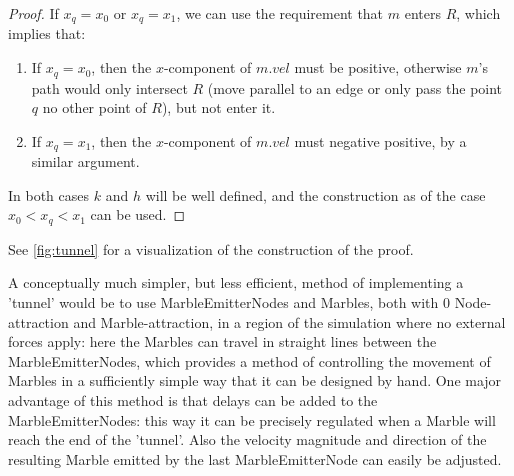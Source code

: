 \begin{proof}
    If $x_q = x_0$ or $x_q = x_1$, we can use the requirement that $m$ enters $R$, which implies that:
    \begin{enumerate}
        \item If $x_q = x_0$, then the $x$-component of $m.vel$ must be positive, otherwise $m$'s path would only intersect $R$ (move parallel to an edge or only pass the point $q$ no other point of $R$), but not enter it.
        \item If $x_q = x_1$, then the $x$-component of $m.vel$ must negative positive, by a similar argument.
    \end{enumerate}
    In both cases $k$ and $h$ will be well defined, and the construction as of the case $x_0 < x_q < x_1$ can be used.
\end{proof}

See \ref{fig:tunnel} for a visualization of the construction of the proof. 

A conceptually much simpler, but less efficient, method of implementing a 'tunnel' would be to use MarbleEmitterNodes and Marbles, both with 0 Node-attraction and Marble-attraction, in a region of the simulation where no external forces apply: here the Marbles can travel in straight lines between the MarbleEmitterNodes, which provides a method of controlling the movement of Marbles in a sufficiently simple way that it can be designed by hand. One major advantage of this method is that delays can be added to the MarbleEmitterNodes: this way it can be precisely regulated when a Marble will reach the end of the 'tunnel'. Also the velocity magnitude and direction of the resulting Marble emitted by the last MarbleEmitterNode can easily be adjusted.

